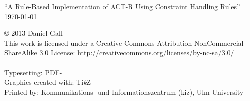 \documentclass[
    a4paper,
    10pt,
    bibliography=totoc,
    twoside,
    openright,
    numbers=noenddot,
    headings=normal,
    DIV=9,
    BCOR=7mm
    ,parskip
]{scrbook}
\newcommand{\fullname}{Daniel Gall}
\newcommand{\titel}{A Rule-Based Implementation of ACT-R Using Constraint Handling Rules}
\newcommand{\jahr}{2013}
\newcommand{\arbeit}{Master Thesis}
\newcommand{\FIXME}[1]{} %
\begin{document}
\clearpage
\thispagestyle{empty}
{
    \small \flushleft \enquote{\titel}\\
    \today
    \vfill



    \copyright{} \jahr{} \fullname{}\\[0.5em]
    This work is licensed under a Creative Commons Attribution-NonCommercial-ShareAlike 3.0 License: \url{http://creativecommons.org/licenses/by-nc-sa/3.0/}\\
    \ccbyncsa\\
    \vspace{0.5cm}
    Typesetting: PDF-\LaTeXe{}\\
    Graphics created with: Ti\textit{k}Z\\
    Printed by: Kommunikations- und Informationszentrum (kiz), Ulm University
}
\end{document}
